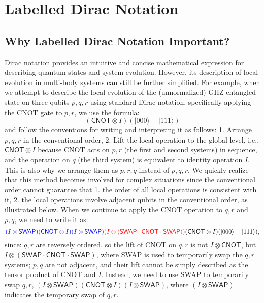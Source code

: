 

\def\>{\ensuremath{\rangle}}
\def\<{\ensuremath{\langle}}

\newcommand {\cnot } {{\mathsf{CNOT}}}
\newcommand {\swap } {{\mathsf{SWAP}}}


\section{Labelled Dirac Notation}
\label{sec: labelled}

\subsection{Why Labelled Dirac Notation Important?}

Dirac notation provides an intuitive and concise mathematical expression for describing quantum states and system evolution. However, its description of local evolution in multi-body systems can still be further simplified. For example, when we attempt to describe the local evolution of the (unnormalized) GHZ entangled state on three qubits $p,q,r$ using standard Dirac notation, specifically applying the CNOT gate to $p,r$, we use the formula:
$$(\cnot\otimes I)(|000\>+|111\>)$$
and follow the conventions for writing and interpreting it as follows: 1. Arrange $p,q,r$ in the conventional order, 2. Lift the local operation to the global level, i.e., $\cnot\otimes I$ because CNOT acts on $p,r$ (the first and second systems) in sequence, and the operation on $q$ (the third system) is equivalent to identity operation $I$. This is also why we arrange them as $p,r,q$ instead of $p,q,r$.
We quickly realize that this method becomes involved for complex situations since the conventional order cannot guarantee that 1. the order of all local operations is consistent with it, 2. the local operations involve adjacent qubits in the conventional order, as illustrated below.
When we continue to apply the CNOT operation to $q,r$ and $p,q$, we need to write it as:
$${\color{blue}(I\otimes \swap)(\cnot\otimes I)(I\otimes \swap)}{\color{red}(I\otimes (\swap\cdot \cnot\cdot \swap))}(\cnot\otimes I)(|000\>+|111\>),$$
since: $q,r$ are reversely ordered, so the lift of CNOT on $q,r$ is not $I\otimes \cnot$, but $I\otimes (\swap\cdot \cnot\cdot \swap)$, where SWAP is used to temporarily swap the $q,r$ systems; $p,q$ are not adjacent, and their lift cannot be simply described as the tensor product of CNOT and $I$. Instead, we need to use SWAP to temporarily swap $q,r$, $(I\otimes \swap)(\cnot\otimes I)(I\otimes \swap)$, where $(I\otimes \swap)$ indicates the temporary swap of $q,r$.

